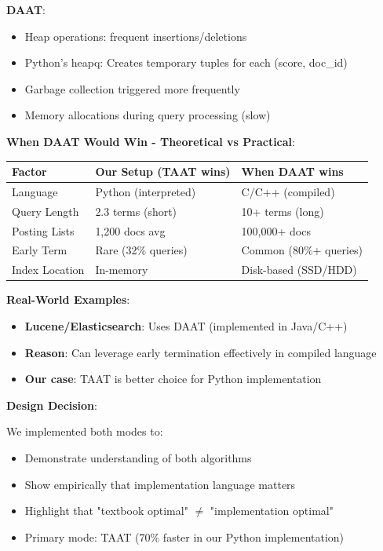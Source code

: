\documentclass[12pt,a4paper]{article}
\begin{document}
\begin{enumerate}
    \textbf{DAAT}:
    \begin{itemize}
        \item Heap operations: frequent insertions/deletions
        \item Python's heapq: Creates temporary tuples for each (score, doc\_id)
        \item Garbage collection triggered more frequently
        \item Memory allocations during query processing (slow)
    \end{itemize}
\end{enumerate}

\textbf{When DAAT Would Win - Theoretical vs Practical}:

\begin{table}[H]
\centering
\small
\begin{tabular}{p{3cm}p{4cm}p{4cm}}
\toprule
\textbf{Factor} & \textbf{Our Setup (TAAT wins)} & \textbf{When DAAT wins} \\
\midrule
Language & Python (interpreted) & C/C++ (compiled) \\
Query Length & 2.3 terms (short) & 10+ terms (long) \\
Posting Lists & 1,200 docs avg & 100,000+ docs \\
Early Term & Rare (32\% queries) & Common (80\%+ queries) \\
Index Location & In-memory & Disk-based (SSD/HDD) \\
\bottomrule
\end{tabular}
\end{table}

\textbf{Real-World Examples}:

\begin{itemize}
    \item \textbf{Lucene/Elasticsearch}: Uses DAAT (implemented in Java/C++)
    \item \textbf{Reason}: Can leverage early termination effectively in compiled language
    \item \textbf{Our case}: TAAT is better choice for Python implementation
\end{itemize}

\textbf{Design Decision}:

We implemented both modes to:
\begin{itemize}
    \item Demonstrate understanding of both algorithms
    \item Show empirically that implementation language matters
    \item Highlight that "textbook optimal" $\neq$ "implementation optimal"
    \item Primary mode: TAAT (70\% faster in our Python implementation)
\end{itemize}
\end{document}
